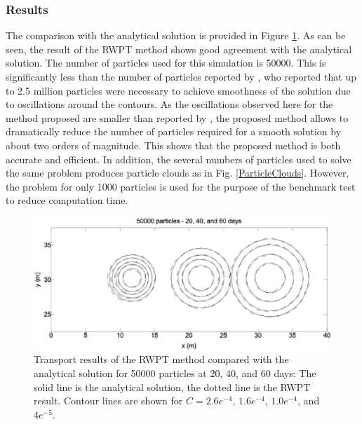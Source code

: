 \subsubsection*{Results}
%
The comparison with the analytical solution is provided in Figure \ref{TransportHomo50K}. As can be seen, the result of the RWPT method shows good agreement with the analytical solution. The number of particles used for this simulation is 50000. This is significantly less than the number of particles reported by \cite{aH03}, who reported that up to 2.5 million particles were necessary to achieve smoothness of the solution due to oscillations around the contours. As the oscillations observed here for the method proposed are smaller than reported by \cite{aH03}, the proposed method allows to dramatically reduce the number of particles required for a smooth solution by about two orders of magnitude. This shows that the proposed method is both accurate and efficient.
In addition, the several numbers of particles used to solve the same problem produces particle clouds as in Fig. \ref{ParticleClouds}. However, the problem for only 1000 particles is used for the purpose of the benchmark test to reduce computation time.
\begin{figure}[h]
\centering
\includegraphics[scale=0.60]{RWPT/figures/TransportHomo50K.eps}
\caption{Transport results of the RWPT method compared with the
analytical solution \cite{aO61} for 50000 particles at 20, 40,
and 60 days: The solid line is the analytical solution, the dotted
line is the RWPT result. Contour lines are shown for $C=2.6e^{-4}$, $1.6e^{-4}$, $1.0e^{-4}$, and $4e^{-5}$.} 
\label{TransportHomo50K}
\end{figure}

